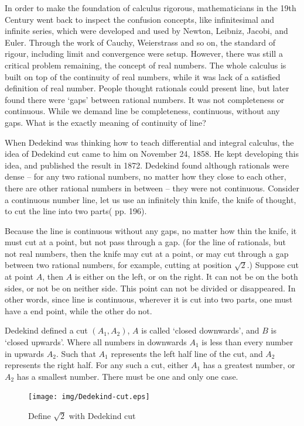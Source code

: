 \documentclass{article}
\begin{document}
In order to make the foundation of calculus rigorous, mathematicians in the 19th Century went back to inspect the confusion concepts, like infinitesimal and infinite series, which were developed and used by Newton, Leibniz, Jacobi, and Euler. Through the work of Cauchy, Weierstrass and so on, the standard of rigour, including limit and convergence were setup. However, there was still a critical problem remaining, the concept of real numbers. The whole calculus is built on top of the continuity of real numbers, while it was lack of a satisfied definition of real number. People thought rationals could present line, but later found there were `gaps' between rational numbers. It was not completeness or continuous. While we demand line be completeness, continuous, without any gaps. What is the exactly meaning of continuity of line?

When Dedekind was thinking how to teach differential and integral calculus, the idea of Dedekind cut came to him on November 24, 1858. He kept developing this idea, and published the result in 1872. Dedekind found although rationals were dense -- for any two rational numbers, no matter how they close to each other, there are other rational numbers in between -- they were not continuous. Consider a continuous number line, let us use an infinitely thin knife, the knife of thought, to cut the line into two parts(\cite{HanXueTao16} pp. 196).

Because the line is continuous without any gaps, no matter how thin the knife, it must cut at a point, but not pass through a gap. (for the line of rationals, but not real numbers, then the knife may cut at a point, or may cut through a gap between two rational numbers, for example, cutting at position $\sqrt{2}$.) Suppose cut at point $A$, then $A$ is either on the left, or on the right. It can not be on the both sides, or not be on neither side. This point can not be divided or disappeared. In other words, since line is continuous, wherever it is cut into two parts, one must have a end point, while the other do not.

Dedekind defined a cut $(A_1, A_2)$, $A$ is called `closed downwards', and $B$ is `closed upwards'. Where all numbers in downwards $A_1$ is less than every number in upwards $A_2$. Such that $A_1$ represents the left half line of the cut, and $A_2$ represents the right half. For any such a cut, either $A_1$ has a greatest number, or $A_2$ has a smallest number. There must be one and only one case.

\begin{figure}[htbp]
 \centering
 \texttt{[image: img/Dedekind-cut.eps]}
 \caption{Define $\sqrt{2}$ with Dedekind cut}
 \label{fig:Dedekind-cut}
\end{figure}
\end{document}
